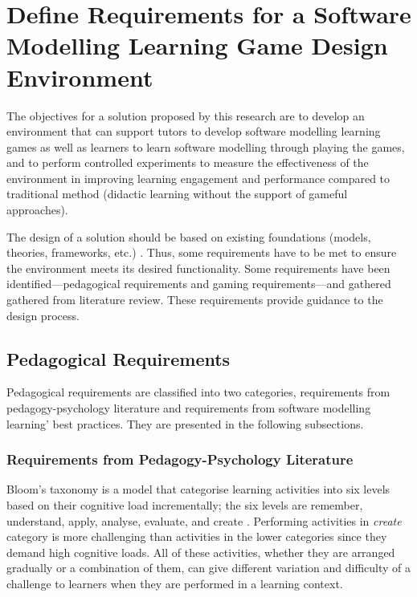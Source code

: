 \documentclass[10pt, a4paper]{report} \usepackage[titletoc]{appendix}
\begin{document}
\section{Define Requirements for a Software Modelling Learning Game Design Environment}
The objectives for a solution proposed by this research are to develop an environment that can support tutors to develop software modelling learning games as well as learners to learn software modelling through playing the games, and to perform controlled experiments to measure the effectiveness of the environment in improving learning engagement and performance compared to traditional method (didactic learning without the support of gameful approaches).

The design of a solution should be based on existing foundations (models, theories, frameworks, etc.) \cite{von2004design}. Thus, some requirements have to be met to ensure the environment meets its desired functionality. Some requirements have been identified---pedagogical requirements and gaming requirements---and gathered gathered from literature review. These requirements provide guidance to the design process.

\subsection{Pedagogical Requirements}
\label{Pedagogical Requirements}
Pedagogical requirements are classified into two categories, requirements from pedagogy-psychology literature and requirements from software modelling learning' best practices. They are presented in the following subsections. 

\subsubsection{Requirements from Pedagogy-Psychology Literature}
\label{Requirements from Pedagogy-Psychology Literature}
Bloom's taxonomy is a model that categorise learning activities into six levels based on their cognitive load incrementally; the six levels are remember, understand, apply, analyse, evaluate, and create \cite{krathwohl2002revision}. Performing activities in \emph{create} category is more challenging than activities in the lower categories since they demand high cognitive loads. All of these activities, whether they are arranged gradually or a combination of them, can give different variation and difficulty of a challenge to learners when they are performed in a learning context. 
\end{document}

